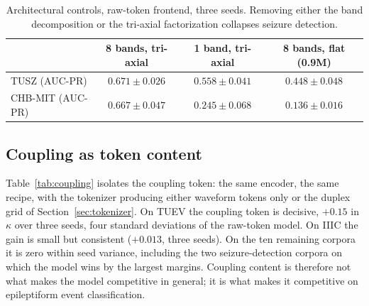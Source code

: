 \begin{table}[t]
\centering
\small
\caption{Architectural controls, raw-token frontend, three seeds. Removing
either the band decomposition or the tri-axial factorization collapses
seizure detection.}
\label{tab:arch}
\begin{tabular}{lccc}
\toprule
 & 8 bands, tri-axial & 1 band, tri-axial & 8 bands, flat (0.9M) \\
\midrule
TUSZ (AUC-PR) & $0.671 \pm 0.026$ & $0.558 \pm 0.041$ & $0.448 \pm 0.048$ \\
CHB-MIT (AUC-PR) & $0.667 \pm 0.047$ & $0.245 \pm 0.068$ & $0.136 \pm 0.016$ \\
\bottomrule
\end{tabular}
\end{table}

\subsection{Coupling as token content}
\label{sec:coupling-results}

Table~\ref{tab:coupling} isolates the coupling token: the same encoder, the
same recipe, with the tokenizer producing either waveform tokens only or the
duplex grid of Section~\ref{sec:tokenizer}. On TUEV the coupling token is
decisive, $+0.15$ in $\kappa$ over three seeds, four standard deviations of
the raw-token model. On IIIC the gain is small but consistent
($+0.013$, three seeds). On the ten remaining corpora it is zero within
seed variance, including the two seizure-detection corpora on which the
model wins by the largest margins. Coupling content is therefore not what
makes the model competitive in general; it is what makes it competitive on
epileptiform event classification.

